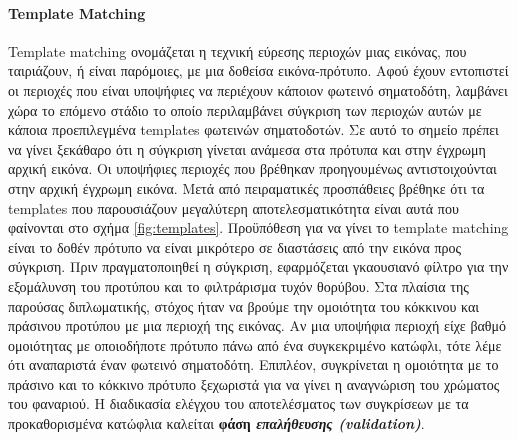 \paragraph{Template Matching}
Template matching ονομάζεται η τεχνική εύρεσης περιοχών μιας εικόνας, που ταιριάζουν, ή είναι παρόμοιες, με μια δοθείσα εικόνα-πρότυπο. Αφού έχουν εντοπιστεί οι περιοχές που είναι υποψήφιες να περιέχουν κάποιον φωτεινό σηματοδότη, λαμβάνει χώρα το επόμενο στάδιο το οποίο περιλαμβάνει σύγκριση των περιοχών αυτών με κάποια προεπιλεγμένα templates φωτεινών σηματοδοτών. Σε αυτό το σημείο πρέπει να γίνει ξεκάθαρο ότι η σύγκριση γίνεται ανάμεσα στα πρότυπα και στην έγχρωμη αρχική εικόνα. Οι υποψήφιες περιοχές που βρέθηκαν προηγουμένως αντιστοιχούνται στην αρχική έγχρωμη εικόνα. Μετά από πειραματικές προσπάθειες βρέθηκε ότι τα templates που παρουσιάζουν μεγαλύτερη αποτελεσματικότητα είναι αυτά που φαίνονται στο σχήμα \ref{fig:templates}. Προϋπόθεση για να γίνει το template matching είναι το δοθέν πρότυπο να είναι μικρότερο σε διαστάσεις από την εικόνα προς σύγκριση. Πριν πραγματοποιηθεί η σύγκριση, εφαρμόζεται γκαουσιανό φίλτρο για την εξομάλυνση του προτύπου και το φιλτράρισμα τυχόν θορύβου. Στα πλαίσια της παρούσας διπλωματικής, στόχος ήταν να βρούμε την ομοιότητα του κόκκινου και πράσινου προτύπου με μια περιοχή της εικόνας. Αν μια υποψήφια περιοχή είχε βαθμό ομοιότητας με οποιοδήποτε πρότυπο πάνω από ένα συγκεκριμένο κατώφλι, τότε λέμε ότι αναπαριστά έναν φωτεινό σηματοδότη. Επιπλέον, συγκρίνεται η ομοιότητα με το πράσινο και το κόκκινο πρότυπο ξεχωριστά για να γίνει η αναγνώριση του χρώματος του φαναριού. Η διαδικασία ελέγχου του αποτελέσματος των συγκρίσεων με τα προκαθορισμένα κατώφλια καλείται \textbf{φάση \emph{επαλήθευσης (validation)}}.

